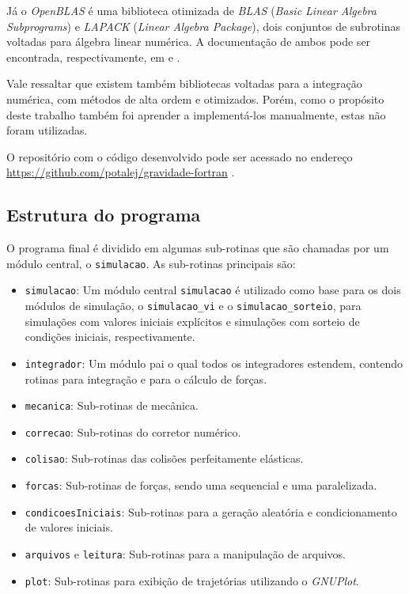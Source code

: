 Já o \textit{OpenBLAS} é uma biblioteca otimizada de \textit{BLAS} (\textit{Basic Linear Algebra Subprograms}) e \textit{LAPACK} (\textit{Linear Algebra Package}), dois conjuntos de subrotinas voltadas para álgebra linear numérica. A documentação de ambos pode ser encontrada, respectivamente, em \cite{OpenBLAS} e \cite{lapack}.

Vale ressaltar que existem também bibliotecas voltadas para a integração numérica, com métodos de alta ordem e otimizados. Porém, como o propósito deste trabalho também foi aprender a implementá-los manualmente, estas não foram utilizadas.

O repositório com o código desenvolvido pode ser acessado no endereço \href{https://github.com/potalej/gravidade-fortran}{https://github.com/potalej/gravidade-fortran} \citep{potalej_gravidade-fortran}.

\subsection{Estrutura do programa}
O programa final é dividido em algumas sub-rotinas que são chamadas por um módulo central, o \verb|simulacao|. As sub-rotinas principais são:
\begin{itemize}
    \item \verb|simulacao|: Um módulo central \verb|simulacao| é utilizado como base para os dois módulos de simulação, o \verb|simulacao_vi| e o \verb|simulacao_sorteio|, para simulações com valores iniciais explícitos e simulações com sorteio de condições iniciais, respectivamente.

    \item \verb|integrador|: Um módulo pai o qual todos os integradores estendem, contendo rotinas para integração e para o cálculo de forças.

    \item \verb|mecanica|: Sub-rotinas de mecânica.

    \item \verb|correcao|: Sub-rotinas do corretor numérico.

    \item \verb|colisao|: Sub-rotinas das colisões perfeitamente elásticas.

    \item \verb|forcas|: Sub-rotinas de forças, sendo uma sequencial e uma paralelizada.

    \item \verb|condicoesIniciais|: Sub-rotinas para a geração aleatória e condicionamento de valores iniciais.

    \item \verb|arquivos| e \verb|leitura|: Sub-rotinas para a manipulação de arquivos.

    \item \verb|plot|: Sub-rotinas para exibição de trajetórias utilizando o \textit{GNUPlot}.
\end{itemize}

